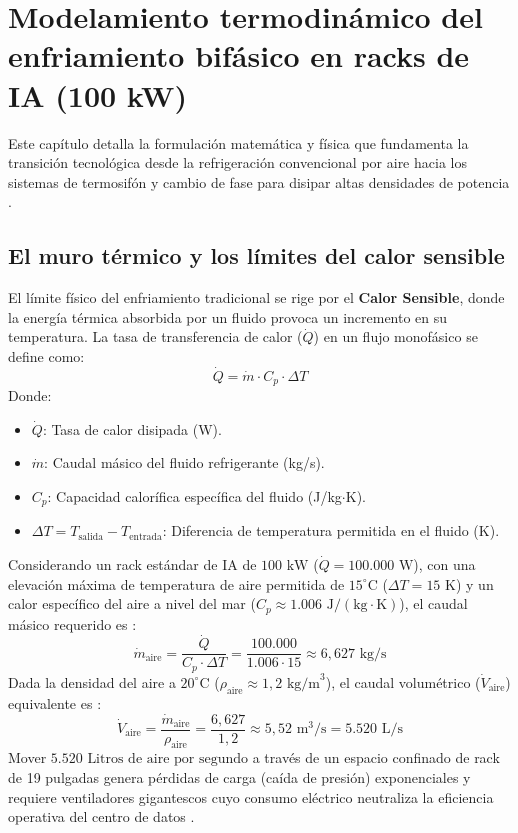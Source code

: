 \chapter{Modelamiento termodin\'amico del enfriamiento bif\'asico en racks de IA (100 kW)}
\label{chap:termodinamica}

Este cap\'itulo detalla la formulaci\'on matem\'atica y f\'isica que fundamenta la transici\'on tecnol\'ogica desde la refrigeraci\'on convencional por aire hacia los sistemas de termosif\'on y cambio de fase para disipar altas densidades de potencia \cite{incropera2007}.

\section{El muro t\'ermico y los l\'imites del calor sensible}\label{sec:calor_sensible}
El l\'imite f\'isico del enfriamiento tradicional se rige por el \textbf{Calor Sensible}, donde la energ\'ia t\'ermica absorbida por un fluido provoca un incremento en su temperatura. La tasa de transferencia de calor ($\dot{Q}$) en un flujo monof\'asico se define como:
\begin{equation}\label{eq:calor_sensible}
\dot{Q} = \dot{m} \cdot C_p \cdot \Delta T
\end{equation}
Donde:
\begin{itemize}
    \item $\dot{Q}$: Tasa de calor disipada (W).
    \item $\dot{m}$: Caudal m\'asico del fluido refrigerante (kg/s).
    \item $C_p$: Capacidad calor\'ifica espec\'ifica del fluido (J/kg$\cdot$K).
    \item $\Delta T = T_{\text{salida}} - T_{\text{entrada}}$: Diferencia de temperatura permitida en el fluido (K).
\end{itemize}

Considerando un rack est\'andar de IA de $100\text{ kW}$ ($\dot{Q} = 100.000\text{ W}$), con una elevaci\'on m\'axima de temperatura de aire permitida de $15^\circ\text{C}$ ($\Delta T = 15\text{ K}$) y un calor espec\'ifico del aire a nivel del mar ($C_p \approx 1.006\text{ J}/(\text{kg}\cdot\text{K})$), el caudal m\'asico requerido es \cite{ashrae2021}:
\begin{equation}
\dot{m}_{\text{aire}} = \frac{\dot{Q}}{C_p \cdot \Delta T} = \frac{100.000}{1.006 \cdot 15} \approx 6,627\text{ kg/s}
\end{equation}
Dada la densidad del aire a $20^\circ\text{C}$ ($\rho_{\text{aire}} \approx 1,2\text{ kg/m}^3$), el caudal volum\'etrico ($\dot{V}_{\text{aire}}$) equivalente es \cite{incropera2007}:
\begin{equation}
\dot{V}_{\text{aire}} = \frac{\dot{m}_{\text{aire}}}{\rho_{\text{aire}}} = \frac{6,627}{1,2} \approx 5,52\text{ m}^3\text{/s} = 5.520\text{ L/s}
\end{equation}
Mover $5.520\text{ Litros de aire por segundo}$ a trav\'es de un espacio confinado de rack de 19 pulgadas genera p\'erdidas de carga (ca\'ida de presi\'on) exponenciales y requiere ventiladores gigantescos cuyo consumo el\'ectrico neutraliza la eficiencia operativa del centro de datos \cite{uptime2024}.

